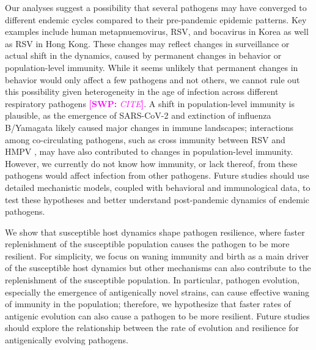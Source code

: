 \documentclass[12pt]{article}
\newcommand{\comment}{\showcomment}
\newcommand{\showcomment}[3]{\textcolor{#1}{\textbf{[#2: }\textsl{#3}\textbf{]}}}
\newcommand{\swp}[1]{\comment{magenta}{SWP}{#1}}
\begin{document}
Our analyses suggest a possibility that several pathogens may have converged to different endemic cycles compared to their pre-pandemic epidemic patterns.
Key examples include human metapnuemovirus, RSV, and bocavirus in Korea as well as RSV in Hong Kong.
These changes may reflect changes in surveillance or actual shift in the dynamics, caused by permanent changes in behavior or population-level immunity.
While it seems unlikely that permanent changes in behavior would only affect a few pathogens and not others, we cannot rule out this possibility given heterogeneity in the age of infection across different respiratory pathogens \swp{CITE}.
A shift in population-level immunity is plausible, as the emergence of SARS-CoV-2 and extinction of influenza B/Yamagata likely caused major changes in immune landscapes;
interactions among co-circulating pathogens, such as cross immunity between RSV and HMPV \citep{bhattacharyya2015cross}, may have also contributed to changes in population-level immunity.
However, we currently do not know how immunity, or lack thereof, from these pathogens would affect infection from other pathogens.
Future studies should use detailed mechanistic models, coupled with behavioral and immunological data, to test these hypotheses and better understand post-pandemic dynamics of endemic pathogens.

We show that susceptible host dynamics shape pathogen resilience, where faster replenishment of the susceptible population causes the pathogen to be more resilient.
For simplicity, we focus on waning immunity and birth as a main driver of the susceptible host dynamics but other mechanisms can also contribute to the replenishment of the susceptible population.
In particular, pathogen evolution, especially the emergence of antigenically novel strains, can cause effective waning of immunity in the population;
therefore, we hypothesize that faster rates of antigenic evolution can also cause a pathogen to be more resilient.
Future studies should explore the relationship between the rate of evolution and resilience for antigenically evolving pathogens.
\end{document}
